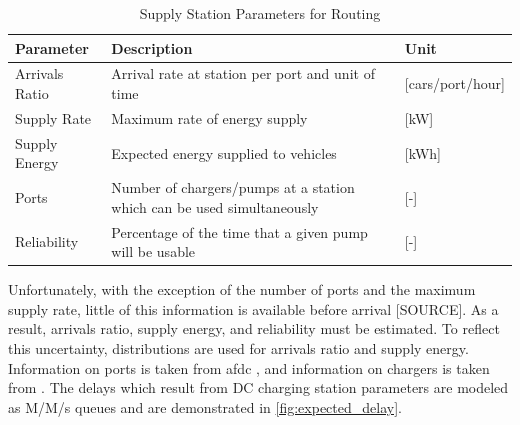 \documentclass[11pt]{article}
\begin{document}
\begin{multicols}{2}
\begin{table}[H]
	\centering
	\caption{Supply Station Parameters for Routing}
	\label{tab:param_supply}
	\begin{tabular}{|C{/8}|C{/8}|C{/8}|}
		\hline Parameter & Description & Unit \\
		\hline Arrivals Ratio & Arrival rate at station per port and unit of time & [cars/port/hour] \\
		\hline Supply Rate & Maximum rate of energy supply & [kW] \\
		\hline Supply Energy & Expected energy supplied to vehicles & [kWh] \\
		\hline Ports & Number of chargers/pumps at a station which can be used simultaneously & [-] \\
		\hline Reliability & Percentage of the time that a given pump will be usable & [-] \\ 
		\hline
	\end{tabular}
\end{table}

Unfortunately, with the exception of the number of ports and the maximum supply rate, little of this information is available before arrival [SOURCE]. As a result, arrivals ratio, supply energy, and reliability must be estimated. To reflect this uncertainty, distributions are used for arrivals ratio and supply energy. Information on ports is taken from \gls{afdc} \cite{afdc_2023}, and information on chargers is taken from \cite{Rempel_2023}. The delays which result from DC charging station parameters are modeled as M/M/s queues and are demonstrated in \ref{fig:expected_delay}.


\end{multicols}
\end{document}
